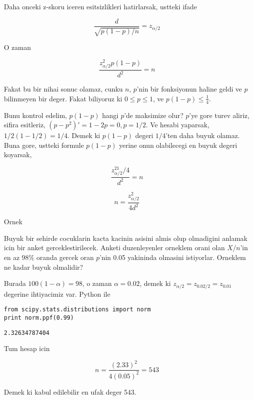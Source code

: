 \documentclass[12pt,fleqn]{article}\usepackage{../common}
\begin{document}
Daha onceki z-skoru iceren esitsizlikleri hatirlarsak, ustteki ifade 

$$ \frac{d}{\sqrt{p(1-p)/n}} = z_{\alpha/2} 
$$

O zaman 

$$ \frac{z_{\alpha/2}^2p(1-p)}{d^2} = n $$

Fakat bu bir nihai sonuc olamaz, cunku $n$, $p$'nin bir fonksiyonun haline
geldi ve $p$ bilinmeyen bir deger. Fakat biliyoruz ki $0 \le p \le 1$, ve
$p(1-p) \le \frac{1}{4}$. 

Bunu kontrol edelim, $p(1-p)$ hangi $p$'de maksimize olur? $p$'ye gore
turev aliriz, sifira esitleriz, $(p-p^2)' = 1 - 2p = 0, p=1/2$. Ve hesabi
yaparsak, $1/2(1-1/2)=1/4$. Demek ki $p(1-p)$ degeri $1/4$'ten daha buyuk
olamaz. Buna gore, ustteki formule $p(1-p)$ yerine onun olabilecegi en
buyuk degeri koyarsak, 

$$ \frac{z_{\alpha/2}^21/4}{d^2} = n $$

$$ n = \frac{z_{\alpha/2}^2}{4d^2} $$


Ornek

Buyuk bir sehirde cocuklarin kacta kacinin asisini almis olup olmadigini
anlamak icin bir anket gerceklestirilecek. Anketi duzenleyenler orneklem
orani olan $X/n$'in en az 98\% oranda gercek oran $p$'nin 0.05 yakininda
olmasini istiyorlar. Orneklem ne kadar buyuk olmalidir? 

Burada $100(1-\alpha) = 98$, o zaman $\alpha = 0.02$, demek ki $z_{\alpha/2}
= z_{0.02/2} = z_{0.01}$ 
degerine ihtiyacimiz var. Python ile

\begin{verbatim}
from scipy.stats.distributions import norm
print norm.ppf(0.99)
\end{verbatim}

\begin{verbatim}
2.32634787404
\end{verbatim}

Tum hesap icin

$$ n = \frac{(2.33)^2}{4(0.05)^2} = 543$$

Demek ki kabul edilebilir en ufak deger 543. 
\end{document}
